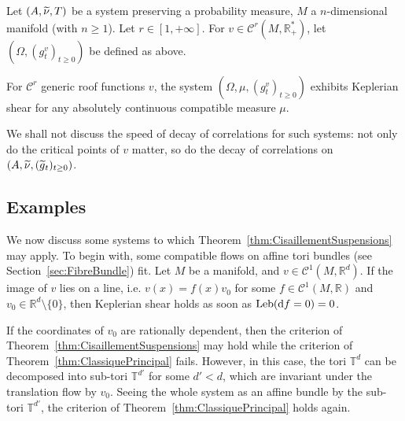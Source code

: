 \documentclass[AHL,Unicode,longabstracts]{cedram}
\DeclareMathOperator{\Leb}{Leb}
\newcommand{\R}{\mathbb{R}}
\newcommand{\Tbb}{\mathbb{T}}
\newcommand{\Ccal}{\mathcal{C}}
\newcommand{\de}{{\rm d}}
\let\oldtilde\tilde
\renewcommand*{\tilde}[1]{\mathchoice{\widetilde{#1}}{\widetilde{#1}}{\oldtilde{#1}}{\oldtilde{#1}}}\let\oldhat\hat
\renewcommand*{\hat}[1]{\mathchoice{\widehat{#1}}{\widehat{#1}}{\oldhat{#1}}{\oldhat{#1}}}\let\oldforall\forall
\renewcommand*{\forall}{\mathrel{\oldforall}}
\begin{document}
\begin{coro}
Let $(A, \tilde{\nu}, T)$ be a system preserving a probability measure, $M$ a $n$-dimensional manifold (with $n \geq 1$). Let $r \in [1, + \infty]$. For $v \in \Ccal^r (M, \R_+^*)$, let $(\Omega, (g_t^v)_{t \geq 0})$ be defined as above.


For $\Ccal^r$ generic roof functions $v$, the system $(\Omega, \mu, (g_t^v)_{t \geq 0})$ exhibits Keplerian shear for any absolutely continuous compatible measure $\mu$.
\end{coro}



We shall not discuss the speed of decay of correlations for such systems: not only do the critical points of $v$ matter, so do the decay of correlations on $(A, \tilde{\nu}, (\tilde{g}_t)_{t \geq 0})$.


\subsection{Examples}\label{subsec:AllongeExemple}

We now discuss some systems to which Theorem~\ref{thm:CisaillementSuspensions} may apply. To begin with, some compatible flows on affine tori bundles (see Section~\ref{sec:FibreBundle}) fit. Let $M$ be a manifold, and $v \in \Ccal^1 (M, \R^d)$. If the image of $v$ lies on a line, i.e. $v(x) = f(x) v_0$ for some $f \in \Ccal^1 (M, \R)$ and $v_0 \in \R^d \setminus \{0\}$, then Keplerian shear holds as soon as $\Leb (\de f =0) = 0$.


If the coordinates of $v_0$ are rationally dependent, then the criterion of Theorem~\ref{thm:CisaillementSuspensions} may hold while the criterion of Theorem~\ref{thm:ClassiquePrincipal} fails. However, in this case, the tori $\Tbb^d$ can be decomposed into sub-tori $\Tbb^{d'}$ for some $d'<d$, which are invariant under the translation flow by $v_0$. Seeing the whole system as an affine bundle by the sub-tori $\Tbb^{d'}$, the criterion of Theorem~\ref{thm:ClassiquePrincipal} holds again.

\end{document}
